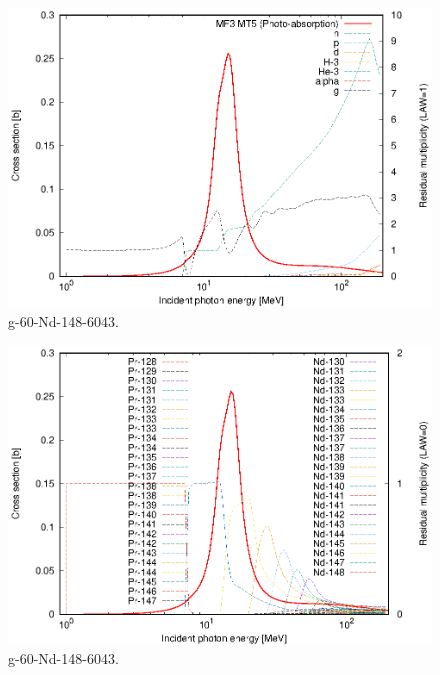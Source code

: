 \begin{figure}
 \includegraphics[width=\linewidth]{eps/g_60-Nd-148_6043.eps}
  \caption{g-60-Nd-148-6043.}
\end{figure}
\begin{figure}
 \includegraphics[width=\linewidth]{eps-law0/g_60-Nd-148_6043.eps}
 \caption{g-60-Nd-148-6043.}
\end{figure}
\newpage \clearpage

